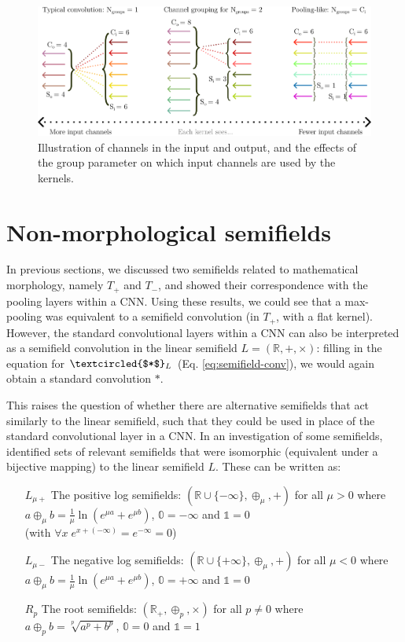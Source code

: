 \documentclass[a4paper, 12pt]{report}
\begin{document}
\begin{figure}[h!]
	\center
  \includegraphics[width=\textwidth]{figures/channels-groups.png}
  \caption{Illustration of channels in the input and output, and the effects of the group parameter on which input channels are used by the kernels.}
  \label{fig:channels-groups}
\end{figure}

\section{Non-morphological semifields}
\label{sec:non-morph}
In previous sections, we discussed two semifields related to mathematical morphology, namely $T_+$ and $T_-$, and showed their correspondence with the pooling layers within a CNN. Using these results, we could see that a max-pooling was equivalent to a semifield convolution (in $T_+$, with a flat kernel). However, the standard convolutional layers within a CNN can also be interpreted as a semifield convolution in the linear semifield
$L=(\mathbb{R}, +, \times)$: filling in the equation for $\textcircled{$*$}_L$ (Eq. \ref{eq:semifield-conv}), we would again obtain a standard convolution $*$.

This raises the question of whether there are alternative semifields that act similarly to the linear semifield, such that they could be used in place of the standard convolutional layer in a CNN. In an investigation of some semifields, \cite{bellaardaxiomatic} identified sets of relevant semifields that were isomorphic (equivalent under a bijective mapping) to the linear semifield $L$. These can be written as:

\begin{itemize}
	\item[$L_{\mu+}$]  The positive log semifields:  $(\mathbb{R}\cup \{-\infty\}, \oplus_\mu, +)$ for all $\mu>0$ where \\$a\oplus_\mu b= \frac{1}{\mu}\ln(e^{\mu a}+e^{\mu b})$, $\mathbb{0}=-\infty$ and $\mathbb{1}=0$ 
	\\(with $\forall x\;e^{x+(-\infty)}=e^{-\infty}=0$)
	\item[$L_{\mu-}$]  The negative log semifields:  $(\mathbb{R}\cup \{+\infty\}, \oplus_\mu, +)$ for all $\mu<0$ where \\$a\oplus_\mu b= \frac{1}{\mu}\ln(e^{\mu a}+e^{\mu b})$, $\mathbb{0}=+\infty$ and $\mathbb{1}=0$ 
	\item[$R_p$]  The root semifields:  $(\mathbb{R}_+, \oplus_p, \times)$ for all $p\ne0$ where \\$a\oplus_p b= \sqrt[p]{a^p+b^p}$, $\mathbb{0}=0$ and $\mathbb{1}=1$
\end{itemize}
\end{document}
